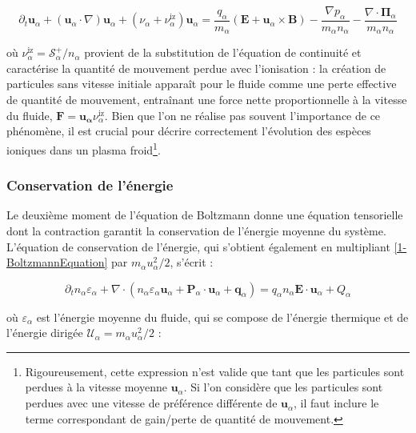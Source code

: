 \begin{refsection}
\begin{equation}
\label{1-eqMouvement}
\partial_t \mathbf{u}_\alpha + (\mathbf{u}_\alpha\cdot\nabla)\mathbf{u}_\alpha
+\left(\nu_\alpha+\nu_\alpha^\text{iz}\right) \mathbf
u_\alpha=\frac{q_\alpha}{m_\alpha}\left(\mathbf E+\mathbf u_\alpha\times \mathbf
B\right) -\frac{\nabla p_\alpha}{m_\alpha n_\alpha} -\frac{\nabla\cdot\boldsymbol{\Pi}_\alpha}{m_\alpha n_\alpha}
\end{equation}

où $\nu_\alpha^{\text{iz}}=\mathcal{S}^+_\alpha/n_\alpha$ provient de la
substitution de l'équation de continuité et caractérise la quantité de mouvement
perdue avec l'ionisation : la création de particules sans
vitesse initiale apparaît pour le fluide comme une perte effective de quantité
de mouvement, entraînant une force nette proportionnelle à la vitesse
du fluide, $\mathbf F=\mathbf{u_\alpha}
\nu_\alpha^{\text{iz}}$. Bien que l'on ne
réalise pas souvent l'importance de ce phénomène, il est crucial pour décrire
correctement l'évolution des espèces ioniques dans un plasma
froid\footnote{Rigoureusement, cette expression n'est valide que tant que les
particules sont perdues à la vitesse moyenne $\mathbf u_\alpha$.
Si l'on considère que les particules sont perdues avec une vitesse de
préférence différente de $\mathbf u_\alpha$, il faut inclure le terme
correspondant de gain/perte de quantité de mouvement.}.

\subsubsection{Conservation de l'énergie}
\label{1-ConservationEnergie}
Le deuxième moment de l'équation de Boltzmann donne une équation tensorielle
dont la contraction garantit la conservation de l'énergie moyenne du système.
L'équation de conservation de
l'énergie, qui s'obtient également en multipliant \eqref{1-BoltzmannEquation}
par $m_\alpha {u}_\alpha^2/2$, s'écrit :

\begin{equation}
\label{1-eqEnergie}
\partial_t n_\alpha\varepsilon_\alpha+
\nabla\cdot\left(n_\alpha\varepsilon_\alpha\mathbf{u}_\alpha+\mathbf
P_\alpha\cdot\mathbf{u}_\alpha + \mathbf q_\alpha\right) =q_\alpha
n_\alpha\mathbf E\cdot
\mathbf{u}_\alpha+{Q}_\alpha
\end{equation}

où $\varepsilon_\alpha$ est l'énergie
moyenne du fluide, qui se compose de l'énergie thermique et de l'énergie dirigée
$\mathcal{U}_{\alpha}=m_\alpha u_\alpha^2/2$ :


\end{refsection}
